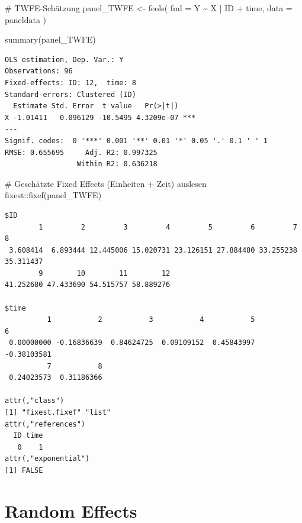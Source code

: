 \documentclass[
  a4paper,
  DIV=11,
  oneside]{scrreprt}
\newenvironment{Shaded}{\begin{snugshade}}{\end{snugshade}}
\newcommand{\AttributeTok}[1]{\textcolor[rgb]{0.40,0.45,0.13}{#1}}
\newcommand{\CommentTok}[1]{\textcolor[rgb]{0.37,0.37,0.37}{#1}}
\newcommand{\FunctionTok}[1]{\textcolor[rgb]{0.28,0.35,0.67}{#1}}
\newcommand{\NormalTok}[1]{\textcolor[rgb]{0.00,0.23,0.31}{#1}}
\newcommand{\OtherTok}[1]{\textcolor[rgb]{0.00,0.23,0.31}{#1}}
\newcommand{\SpecialCharTok}[1]{\textcolor[rgb]{0.37,0.37,0.37}{#1}}
\begin{document}
\begin{Shaded}
\begin{Highlighting}[]
\CommentTok{\# TWFE{-}Schätzung}
\NormalTok{panel\_TWFE }\OtherTok{\textless{}{-}} \FunctionTok{feols}\NormalTok{(}
  \AttributeTok{fml =}\NormalTok{ Y }\SpecialCharTok{\textasciitilde{}}\NormalTok{ X }\SpecialCharTok{|}\NormalTok{ ID }\SpecialCharTok{+}\NormalTok{ time,  }
  \AttributeTok{data =}\NormalTok{ paneldata}
\NormalTok{)}

\FunctionTok{summary}\NormalTok{(panel\_TWFE)}
\end{Highlighting}
\end{Shaded}

\begin{verbatim}
OLS estimation, Dep. Var.: Y
Observations: 96
Fixed-effects: ID: 12,  time: 8
Standard-errors: Clustered (ID) 
  Estimate Std. Error  t value   Pr(>|t|)    
X -1.01411   0.096129 -10.5495 4.3209e-07 ***
---
Signif. codes:  0 '***' 0.001 '**' 0.01 '*' 0.05 '.' 0.1 ' ' 1
RMSE: 0.655695     Adj. R2: 0.997325
                 Within R2: 0.636218
\end{verbatim}

\begin{Shaded}
\begin{Highlighting}[]
\CommentTok{\# Geschätzte Fixed Effects (Einheiten + Zeit) auslesen}
\NormalTok{fixest}\SpecialCharTok{::}\FunctionTok{fixef}\NormalTok{(panel\_TWFE)}
\end{Highlighting}
\end{Shaded}

\begin{verbatim}
$ID
        1         2         3         4         5         6         7         8 
 3.608414  6.893444 12.445006 15.020731 23.126151 27.884480 33.255238 35.311437 
        9        10        11        12 
41.252680 47.433690 54.515757 58.889276 

$time
          1           2           3           4           5           6 
 0.00000000 -0.16836639  0.84624725  0.09109152  0.45843997 -0.38103581 
          7           8 
 0.24023573  0.31186366 

attr(,"class")
[1] "fixest.fixef" "list"        
attr(,"references")
  ID time 
   0    1 
attr(,"exponential")
[1] FALSE
\end{verbatim}

\section{Random Effects}\label{random-effects}
\end{document}
